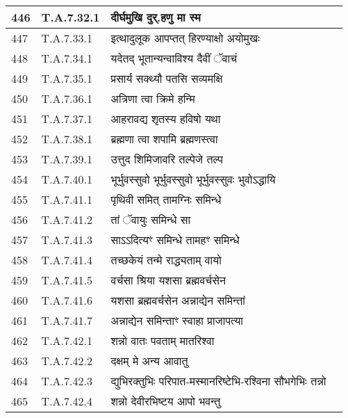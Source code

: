 \documentclass[17pt]{extarticle}
\begin{document}
\begin{longtable}{||p{0.4in}||p{0.9in}||p{4.0in}||p{0.9in}||}
        \hline
            446 & T.A.7.32.1 & दीर्घमुखि दुर्.हणु मा स्म &      \\
        \hline
            447 & T.A.7.33.1 & इत्थादुलूक आपप्तत् हिरण्याक्षो अयोमुखः &      \\
        \hline
            448 & T.A.7.34.1 & यदेतद् भूतान्यन्वाविश्य दैवीं ॅवाचं &      \\
        \hline
            449 & T.A.7.35.1 & प्रसार्य सक्थ्यौ पतसि सव्यमक्षि &      \\
        \hline
            450 & T.A.7.36.1 & अत्रिणा त्वा क्रिमे हन्मि &      \\
        \hline
            451 & T.A.7.37.1 & आहरावद्य शृतस्य हविषो यथा &      \\
        \hline
            452 & T.A.7.38.1 & ब्रह्मणा त्वा शपामि ब्रह्मणस्त्वा &      \\
        \hline
            453 & T.A.7.39.1 & उत्तुद शिमिजावरि तल्पेजे तल्प &      \\
        \hline
            454 & T.A.7.40.1 & भूर्भुवस्सुवो भूर्भुवस्सुवो भूर्भुवस्सुवः भुवोऽद्धायि &      \\
        \hline
            455 & T.A.7.41.1 & पृथिवी समित् तामग्निः समिन्धे &      \\
        \hline
            456 & T.A.7.41.2 & तां ॅवायुः समिन्धे सा &      \\
        \hline
            457 & T.A.7.41.3 & साऽऽदित्यꣳ समिन्धे तामहꣳ समिन्धे &      \\
        \hline
            458 & T.A.7.41.4 & तच्छकेयं तन्मे राद्ध्यताम् वायो &      \\
        \hline
            459 & T.A.7.41.5 & वर्चसा श्रिया यशसा ब्रह्मवर्चसेन &      \\
        \hline
            460 & T.A.7.41.6 & यशसा ब्रह्मवर्चसेन अन्नाद्येन समिन्तां &      \\
        \hline
            461 & T.A.7.41.7 & अन्नाद्येन समिन्ताꣳ स्वाहा प्राजापत्या &      \\
        \hline
            462 & T.A.7.42.1 & शन्नो वातः पवताम् मातरिश्वा &      \\
        \hline
            463 & T.A.7.42.2 & दक्षम् मे अन्य आवातु &      \\
        \hline
            464 & T.A.7.42.3 & द्युभिरक्तुभिः परिपात{-}मस्मानरिष्टेभि{-}रश्विना सौभगेभिः तन्नो &      \\
        \hline
            465 & T.A.7.42.4 & शन्नो देवीरभिष्टय आपो भवन्तु &      \\
        \hline

\end{longtable}
\end{document}
